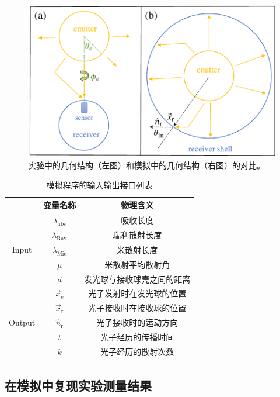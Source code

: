 \begin{figure}[htb]
    \centering
    \includegraphics[width=0.85\linewidth]{img/pathfinder_sim_geo.pdf}
    \caption{实验中的几何结构（左图）和模拟中的几何结构（右图）的对比。}
    \label{fig:pathfinder_sim_geo}
\end{figure}

\begin{table}[]
    \centering
    \caption{模拟程序的输入输出接口列表}
    \label{tab:pathfinder_sim_io}
    \begin{tabular}{|c|c|c|}
        \hline
         & 变量名称 & 物理含义 \\
        \hline
        \multirow{5}{3em}{Input} 
        & $\lambda_\mathrm{abs}$ & 吸收长度  \\
        & $\lambda_\mathrm{Ray}$ & 瑞利散射长度 \\
        & $\lambda_\mathrm{Mie}$ & 米散射长度 \\
        & $\mu$ & 米散射平均散射角 \\
        & $d$ & 发光球与接收球壳之间的距离 \\
        \hline
        \multirow{5}{3em}{Output} 
        & $\vec{x}_\mathrm{e}$ & 光子发射时在发光球的位置  \\
        & $\vec{x}_\mathrm{r}$ & 光子接收时在接收球的位置 \\
        & $\hat{n}_\mathrm{r}$ & 光子接收时的运动方向 \\
        & $t$ & 光子经历的传播时间 \\
        & $k$ & 光子经历的散射次数 \\
        \hline
    \end{tabular}
\end{table}


\subsection{在模拟中复现实验测量结果}

